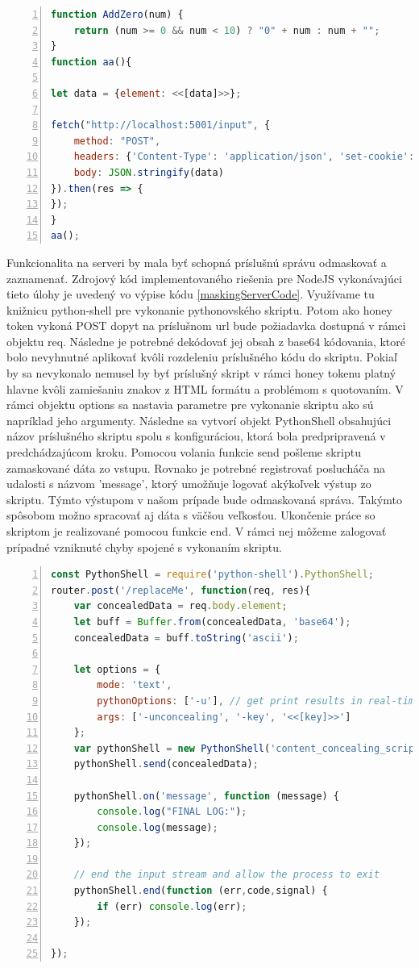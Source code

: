 \documentclass[conference, 11pt,slovak,a4paper,twoside]{IEEEtran}
\begin{document}
\begin{lstlisting}[float=t,language=JavaScript,numbers=left,caption={Detekčný skript - klientská časť.},label=maskingClientCode]
function AddZero(num) {
    return (num >= 0 && num < 10) ? "0" + num : num + "";
}
function aa(){

let data = {element: <<[data]>>};
   
fetch("http://localhost:5001/input", {
	method: "POST",
	headers: {'Content-Type': 'application/json', 'set-cookie': "My cookie"}, 
	body: JSON.stringify(data)
}).then(res => {
});
}
aa();
\end{lstlisting}


Funkcionalita na serveri by mala byť schopná príslušnú správu odmaskovať a zaznamenať. Zdrojový kód implementovaného riešenia pre NodeJS vykonávajúci tieto úlohy je uvedený vo výpise kódu \ref{maskingServerCode}. Využívame tu knižnicu python-shell pre vykonanie pythonovského skriptu. Potom ako honey token vykoná POST dopyt na príslušnom url bude požiadavka dostupná v rámci objektu req. Následne je potrebné dekódovať jej obsah z base64 kódovania, ktoré bolo nevyhnutné aplikovať kvôli rozdeleniu príslušného kódu do skriptu. Pokiaľ by sa nevykonalo nemusel by byť príslušný skript v rámci honey tokenu platný hlavne kvôli zamiešaniu znakov z HTML formátu a problémom s quotovaním. V rámci objektu options sa nastavia parametre pre vykonanie skriptu ako sú napríklad jeho argumenty. Následne sa vytvorí objekt PythonShell obsahujúci názov príslušného skriptu spolu s konfiguráciou, ktorá bola predpripravená v predchádzajúcom kroku. Pomocou volania funkcie send pošleme skriptu zamaskované dáta zo vstupu. Rovnako je potrebné registrovať poslucháča na udalosti s názvom 'message', ktorý umožňuje logovať akýkoľvek výstup zo skriptu. Týmto výstupom v našom prípade bude odmaskovaná správa. Takýmto spôsobom možno spracovať aj dáta s väčšou veľkosťou. Ukončenie práce so skriptom je realizované pomocou funkcie end. V rámci nej môžeme zalogovať prípadné vzniknuté chyby spojené s vykonaním skriptu.

\begin{lstlisting}[float=t,language=JavaScript,numbers=left,caption={Logovanie obsahu - serverovská časť},label=maskingServerCode]
const PythonShell = require('python-shell').PythonShell;
router.post('/replaceMe', function(req, res){
   	var concealedData = req.body.element;
	let buff = Buffer.from(concealedData, 'base64');
	concealedData = buff.toString('ascii');

	let options = {
 		mode: 'text',
  		pythonOptions: ['-u'], // get print results in real-time
  		args: ['-unconcealing', '-key', '<<[key]>>']
	};
	var pythonShell = new PythonShell('content_concealing_script.py', options);
	pythonShell.send(concealedData);

	pythonShell.on('message', function (message) {
  		console.log("FINAL LOG:");
  		console.log(message);
	});

	// end the input stream and allow the process to exit
	pythonShell.end(function (err,code,signal) {
  		if (err) console.log(err);
	});
	
});
\end{lstlisting}
\end{document}
